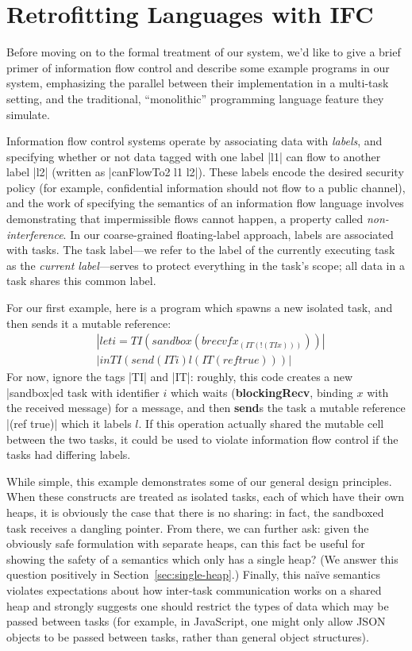 \section{Retrofitting Languages with IFC}
\label{sec:retrofit}

Before moving on to the formal treatment of our system, we'd like to give
a brief primer of information flow control and describe some example programs
in our system, emphasizing the parallel between their implementation
in a multi-task setting, and the traditional, ``monolithic'' programming
language feature they simulate.

Information flow control systems operate by associating data with \emph{labels},
and specifying whether or not data tagged with one label |l1| can flow
to another
label |l2| (written as |canFlowTo2 l1 l2|).  These labels encode the desired
security policy (for example, confidential information should not flow to
a public channel), and the work of specifying the semantics of an information
flow language involves demonstrating that impermissible flows cannot happen,
a property called \emph{non-interference}.
%
In our coarse-grained floating-label approach, labels are associated with tasks.
%
The task label---we refer to the label of the currently executing task as the
\emph{current label}---serves to protect everything in the task's scope;
all data in a task shares this common label.

For our first example, here is a program which spawns a new isolated task,
and then sends it a mutable reference:
\begin{align*}
    & |let i = TI (sandbox (brecvf x _ (IT (!(TI x)))))|\\
    & |in TI (send (IT i) l (IT (ref true)))|
\end{align*}
For now, ignore the tags |TI| and |IT|: roughly, this code creates a new
|sandbox|ed task with identifier $i$ which waits (\textbf{blockingRecv}, binding $x$ with the received message) for a
message, and then \textbf{send}s the task a mutable reference |(ref
true)| which it labels $l$.  If this operation actually shared the mutable cell between the two tasks, it
could be used to violate information flow control if the tasks had differing labels.

While simple, this example demonstrates some of our general design principles.  When these
constructs are treated as isolated tasks, each of which have their own heaps, it
is obviously the case that there is no sharing: in fact, the sandboxed task receives a dangling pointer.  From
there, we can further ask: given the obviously safe formulation with
separate heaps, can this fact be useful for showing the safety of a
semantics which only has a single heap? (We answer this question
positively in Section~\ref{sec:single-heap}.)  Finally, this na\"ive
semantics violates expectations about how inter-task communication works
on a shared heap and strongly suggests one should restrict the types of
data which may be passed between tasks (for example, in JavaScript, one
might only allow JSON objects to be passed between tasks, rather than
general object structures).

